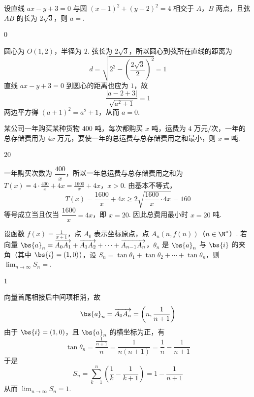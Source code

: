 \begin{problem}
设直线 \(ax-y+3=0\) 与圆 \((x-1)^2+(y-2)^2=4\) 相交于 \(A\)，\(B\) 两点，且弦 \(AB\) 的长为 \(2\sqrt{3}\)，则 \(a=\)\fillinblank{}.
\end{problem}

\begin{answer}
\(0\)
\end{answer}

\begin{solution}
圆心为 \(O(1,2)\)，半径为 \(2\). 弦长为 \(2\sqrt3\)，所以圆心到弦所在直线的距离为
\[
d=\sqrt{2^{2}-\left(\frac{2\sqrt3}{2}\right)^{2}}=1
\]
直线 \(ax-y+3=0\) 到圆心的距离也应为 \(1\)，故
\[
\frac{|a-2+3|}{\sqrt{a^{2}+1}}=1
\]
两边平方得 \((a+1)^{2}=a^{2}+1\)，从而 \(a=0\).
\end{solution}

\begin{problem}
某公司一年购买某种货物 \(400\text{ 吨}\)，每次都购买 \(x\text{ 吨}\)，运费为 \(4\text{ 万元/次}\)，一年的总存储费用为 \(4x\text{ 万元}\)，要使一年的总运费与总存储费用之和最小，则 \(x=\)\fillinblank{}\(\text{吨}\).
\end{problem}

\begin{answer}
\(20\)
\end{answer}

\begin{solution}
一年购买次数为 \(\dfrac{400}{x}\)，所以一年总运费与总存储费用之和为
\(T(x)=4\cdot\frac{400}{x}+4x=\frac{1600}{x}+4x\)，\(x>0\).
由基本不等式，
\[
T(x)=\frac{1600}{x}+4x\geqslant2\sqrt{\frac{1600}{x}\cdot4x}=160
\]
等号成立当且仅当 \(\dfrac{1600}{x}=4x\)，即 \(x=20\). 因此总费用最小时 \(x=20\) 吨.
\end{solution}

\begin{problem}
设函数 \(f(x)=\frac{1}{x+1}\)，点 \(A_{0}\) 表示坐标原点，点 \(A_{n}(n,f(n))\)（\(n\in\N^{*}\)）. 若向量 \(\bs{a}_{n}=\overrightarrow{A_{0}A_{1}}+\overrightarrow{A_{1}A_{2}}+\cdots+\overrightarrow{A_{n-1}A_{n}}\)，\(\theta_{n}\) 是 \(\bs{a}_{n}\) 与 \(\bs{i}\) 的夹角（其中 \(\bs{i}=(1,0)\)），设 \(S_{n}=\tan\theta_{1}+\tan\theta_{2}+\cdots+\tan\theta_{n}\)，则 \(\displaystyle\lim_{n\to\infty}S_{n}=\)\fillinblank{}.
\end{problem}

\begin{answer}
\(1\)
\end{answer}

\begin{solution}
向量首尾相接后中间项相消，故
\[
\bs{a}_{n}=\overrightarrow{A_{0}A_{n}}=\left(n,\frac{1}{n+1}\right)
\]
由于 \(\bs{i}=(1,0)\)，且 \(\bs{a}_{n}\) 的横坐标为正，有
\[
\tan\theta_{n}=\frac{\frac{1}{n+1}}{n}=\frac{1}{n(n+1)}=\frac1n-\frac1{n+1}
\]
于是
\[
S_{n}=\sum_{k=1}^{n}\left(\frac1k-\frac1{k+1}\right)=1-\frac1{n+1}
\]
从而 \(\displaystyle\lim_{n\to\infty}S_{n}=1\).
\end{solution}

